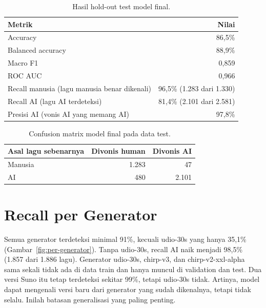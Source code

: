 \begin{table}[htbp]
\centering
\singlespacing\small
\caption{Hasil hold-out test model final.}
\label{tab:test}
\begin{tabular}{lr}
\toprule
Metrik & Nilai\\
\midrule
Accuracy & 86,5\%\\
Balanced accuracy & 88,9\%\\
Macro F1 & 0,859\\
ROC AUC & 0,966\\
Recall manusia (lagu manusia benar dikenali) & 96,5\% (1.283 dari 1.330)\\
Recall AI (lagu AI terdeteksi) & 81,4\% (2.101 dari 2.581)\\
Presisi AI (vonis AI yang memang AI) & 97,8\%\\
\bottomrule
\end{tabular}
\end{table}

\begin{table}[htbp]
\centering
\singlespacing\small
\caption{Confusion matrix model final pada data test.}
\label{tab:confusion}
\begin{tabular}{lrr}
\toprule
Asal lagu sebenarnya & Divonis human & Divonis AI\\
\midrule
Manusia & 1.283 & 47\\
AI & 480 & 2.101\\
\bottomrule
\end{tabular}
\end{table}

\section{Recall per Generator}
Semua generator terdeteksi minimal 91\%, kecuali udio-30s yang hanya 35,1\% (Gambar~\ref{fig:per-generator}). Tanpa udio-30s, recall AI naik menjadi 98,5\% (1.857 dari 1.886 lagu). Generator udio-30s, chirp-v3, dan chirp-v2-xxl-alpha sama sekali tidak ada di data train dan hanya muncul di validation dan test. Dua versi Suno itu tetap terdeteksi sekitar 99\%, tetapi udio-30s tidak. Artinya, model dapat mengenali versi baru dari generator yang sudah dikenalnya, tetapi tidak selalu. Inilah batasan generalisasi yang paling penting.

